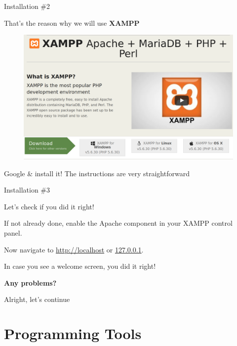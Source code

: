 \begin{frame}{Installation \#{}2}

	That's the reason why we will use \textbf{XAMPP} \pause
	\begin{figure}
  		\includegraphics[width=\linewidth]{img/xampp.png}
	\end{figure}
	
	\pause
	
	Google \& install it! The instructions are very straightforward
	
\end{frame}

\begin{frame}{Installation \#{}3}

	Let's check if you did it right!
	
	If not already done, enable the Apache component in your XAMPP control panel. \pause
	
	Now navigate to \url{http://localhost} or \url{127.0.0.1}.
	
	In case you see a welcome screen, you did it right!
	
	\textbf{Any problems?} \pause
	
	Alright, let's continue
	
\end{frame}


\section{Programming Tools}

